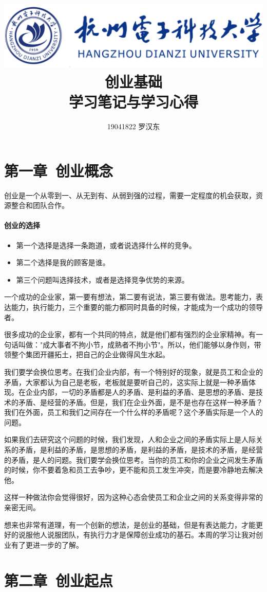 \documentclass[UTF8]{article}
\author{19041822 罗汉东}
\title{
	\includegraphics[scale = 1.0]{HDU.png}\\
    \vspace{1in}
    \textmd{ \Huge\textbf{创业基础}}\\
    \textmd{\textbf{学习笔记与学习心得}}\\
   	\vspace{4.5in}
}
\begin{document}
\maketitle
\newpage
\tableofcontents
\newpage
\section{第一章\ 创业概念}
创业是一个从零到一、从无到有、从弱到强的过程，需要一定程度的机会获取，资源整合和团队合作。
\paragraph{创业的选择}
\begin{itemize}
    \item 第一个选择是选择一条跑道，或者说选择什么样的竞争。
    \item 第二个选择是我的顾客是谁。
    \item 第三个问题叫选择技术，或者是选择竞争优势的来源。
\end{itemize}
一个成功的企业家，第一要有想法，第二要有说法，第三要有做法。思考能力，表达能力，执行能力，三个重要的能力都同时具备的时候，才能成为一个成功的领导者。

很多成功的企业家，都有一个共同的特点，就是他们都有强烈的企业家精神。有一句话叫做："成大事者不拘小节，成熟者不拘小节"。所以，他们能够以身作则，带领整个集团开疆拓土，把自己的企业做得风生水起。

我们要学会换位思考。在我们企业内部，有一个特别好的现象，就是员工和企业的矛盾，大家都认为自己是老板，老板就是要听自己的，这实际上就是一种矛盾体现。在企业内部，一切的矛盾都是人的矛盾、是利益的矛盾、是思想的矛盾、是技术的矛盾、是经营的矛盾。但是，我们在企业外面，是不是也存在这样一种矛盾？我们在外面，员工和我们之间存在一个什么样的矛盾呢？这个矛盾实际是一个人的问题。

如果我们去研究这个问题的时候，我们发现，人和企业之间的矛盾实际上是人际关系的矛盾，是利益的矛盾，是思想的矛盾，是利益的矛盾，是技术的矛盾，是经营的矛盾，是人的问题。我们要学会换位思考。当你的员工和你的企业之间发生矛盾的时候，你不要着急和员工去争吵，更不能和员工发生冲突，而是要冷静地去解决他。

这样一种做法你会觉得很好，因为这种心态会使员工和企业之间的关系变得非常的亲密无间。

想来也非常有道理，有一个创新的想法，是创业的基础，但是有表达能力，才能更好的说服他人说服团队，有执行力才是保障创业成功的基石。本周的学习让我对创业有了更进一步的了解。


\section{第二章\ 创业起点}
\end{document}
